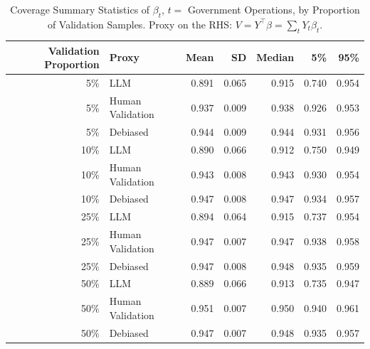 \begin{table}

\caption{\label{tab:unnamed-chunk-1}Coverage Summary Statistics of $\beta_{t}$, $t=$ Government Operations, by Proportion of Validation Samples.
      Proxy on the RHS: $V = Y^\top \beta = \sum_{t} Y_t \beta_t$.}
\centering
\begin{tabular}[t]{rlrrrrr}
\toprule
Validation Proportion & Proxy & Mean & SD & Median & 5\% & 95\%\\
\midrule
5\% & LLM & 0.891 & 0.065 & 0.915 & 0.740 & 0.954\\
5\% & Human Validation & 0.937 & 0.009 & 0.938 & 0.926 & 0.953\\
5\% & Debiased & 0.944 & 0.009 & 0.944 & 0.931 & 0.956\\
10\% & LLM & 0.890 & 0.066 & 0.912 & 0.750 & 0.949\\
10\% & Human Validation & 0.943 & 0.008 & 0.943 & 0.930 & 0.954\\
10\% & Debiased & 0.947 & 0.008 & 0.947 & 0.934 & 0.957\\
25\% & LLM & 0.894 & 0.064 & 0.915 & 0.737 & 0.954\\
25\% & Human Validation & 0.947 & 0.007 & 0.947 & 0.938 & 0.958\\
25\% & Debiased & 0.947 & 0.008 & 0.948 & 0.935 & 0.959\\
50\% & LLM & 0.889 & 0.066 & 0.913 & 0.735 & 0.947\\
50\% & Human Validation & 0.951 & 0.007 & 0.950 & 0.940 & 0.961\\
50\% & Debiased & 0.947 & 0.007 & 0.948 & 0.935 & 0.957\\
\bottomrule
\end{tabular}
\end{table}
